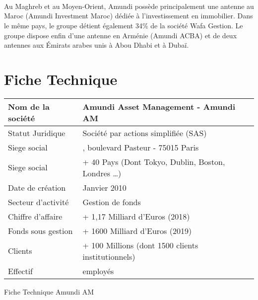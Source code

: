 \\~\\~\\ \par Au Maghreb et au Moyen-Orient, Amundi possède principalement une antenne au Maroc (Amundi Investment Maroc) dédiée à l'investissement en immobilier. Dans le même pays, le groupe détient également 34\% de la société Wafa Gestion. Le groupe dispose enfin d'une antenne en Arménie (Amundi ACBA) et de deux antennes aux Émirats arabes unis à Abou Dhabi et à Dubaï.
\section{Fiche Technique}

\begin{center}
    \begin{tabularx}{0.8\textwidth} { 
        | >{\raggedright\arraybackslash}X
        | >{\centering\arraybackslash}X | }
    \hline
    Nom de la société   &   Amundi Asset Management - Amundi AM \\
    \hline
    Statut Juridique    &   Société par actions simplifiée (SAS)  \\
    \hline
    Siege social        &   90, boulevard Pasteur - 75015 Paris  \\
    \hline
    Siege social        &   + 40 Pays (Dont Tokyo, Dublin, Boston, Londres \dots) \\
    \hline
    Date de création    &   Janvier 2010  \\
    \hline
    Secteur d’activité  &   Gestion de fonds  \\
    \hline
    Chiffre d’affaire   &   + 1,17 Milliard d'Euros (2018)  \\
    \hline
    Fonds sous gestion  &   + 1600 Milliard d'Euros (2019)  \\
    \hline
    Clients             &   + 100 Millions (dont 1500 clients institutionnels)  \\
    \hline
    Effectif            &   2000 employés\\
    \hline
    \end{tabularx}
    \begin{table}[htp]
        \caption{Fiche Technique Amundi AM}
    \end{table}
\end{center}
